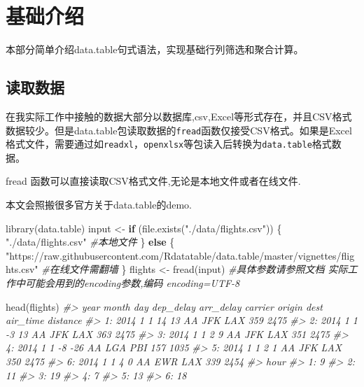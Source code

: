 \documentclass[
]{book}
\newenvironment{Shaded}{\begin{snugshade}}{\end{snugshade}}
\newcommand{\CommentTok}[1]{\textcolor[rgb]{0.56,0.35,0.01}{\textit{#1}}}
\newcommand{\ControlFlowTok}[1]{\textcolor[rgb]{0.13,0.29,0.53}{\textbf{#1}}}
\newcommand{\FunctionTok}[1]{\textcolor[rgb]{0.00,0.00,0.00}{#1}}
\newcommand{\NormalTok}[1]{#1}
\newcommand{\OtherTok}[1]{\textcolor[rgb]{0.56,0.35,0.01}{#1}}
\newcommand{\StringTok}[1]{\textcolor[rgb]{0.31,0.60,0.02}{#1}}
\begin{document}
\hypertarget{ux57faux7840ux4ecbux7ecd}{%
\section{基础介绍}\label{ux57faux7840ux4ecbux7ecd}}

本部分简单介绍data.table句式语法，实现基础行列筛选和聚合计算。

\hypertarget{ux8bfbux53d6ux6570ux636e}{%
\subsection{读取数据}\label{ux8bfbux53d6ux6570ux636e}}

在我实际工作中接触的数据大部分以数据库,csv,Excel等形式存在，并且CSV格式数据较少。但是data.table包读取数据的\texttt{fread}函数仅接受CSV格式。如果是Excel格式文件，需要通过如\texttt{readxl}，\texttt{openxlsx}等包读入后转换为\texttt{data.table}格式数据。

fread 函数可以直接读取CSV格式文件,无论是本地文件或者在线文件.

本文会照搬很多官方关于data.table的demo.

\begin{Shaded}
\begin{Highlighting}[]
\FunctionTok{library}\NormalTok{(data.table)}
\NormalTok{input }\OtherTok{\textless{}{-}} \ControlFlowTok{if}\NormalTok{ (}\FunctionTok{file.exists}\NormalTok{(}\StringTok{"./data/flights.csv"}\NormalTok{)) \{}
   \StringTok{"./data/flights.csv"} \CommentTok{\#本地文件}
\NormalTok{\} }\ControlFlowTok{else}\NormalTok{ \{}
  \StringTok{"https://raw.githubusercontent.com/Rdatatable/data.table/master/vignettes/flights.csv"} \CommentTok{\#在线文件需翻墙}
\NormalTok{\}}
\NormalTok{flights }\OtherTok{\textless{}{-}} \FunctionTok{fread}\NormalTok{(input) }\CommentTok{\#具体参数请参照文档  实际工作中可能会用到的encoding参数,编码 encoding=\textquotesingle{}UTF{-}8\textquotesingle{}}

\FunctionTok{head}\NormalTok{(flights)}
\CommentTok{\#\textgreater{}    year month day dep\_delay arr\_delay carrier origin dest air\_time distance}
\CommentTok{\#\textgreater{} 1: 2014     1   1        14        13      AA    JFK  LAX      359     2475}
\CommentTok{\#\textgreater{} 2: 2014     1   1        {-}3        13      AA    JFK  LAX      363     2475}
\CommentTok{\#\textgreater{} 3: 2014     1   1         2         9      AA    JFK  LAX      351     2475}
\CommentTok{\#\textgreater{} 4: 2014     1   1        {-}8       {-}26      AA    LGA  PBI      157     1035}
\CommentTok{\#\textgreater{} 5: 2014     1   1         2         1      AA    JFK  LAX      350     2475}
\CommentTok{\#\textgreater{} 6: 2014     1   1         4         0      AA    EWR  LAX      339     2454}
\CommentTok{\#\textgreater{}    hour}
\CommentTok{\#\textgreater{} 1:    9}
\CommentTok{\#\textgreater{} 2:   11}
\CommentTok{\#\textgreater{} 3:   19}
\CommentTok{\#\textgreater{} 4:    7}
\CommentTok{\#\textgreater{} 5:   13}
\CommentTok{\#\textgreater{} 6:   18}
\end{Highlighting}
\end{Shaded}
\end{document}
